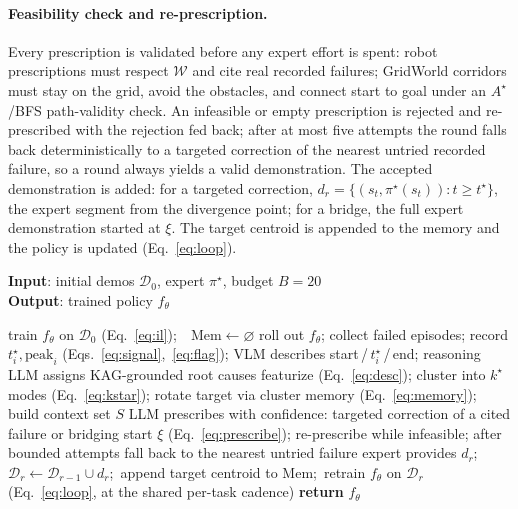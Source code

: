 \documentclass[letterpaper]{article} %
\begin{document}
\paragraph{Feasibility check and re-prescription.}
Every prescription is validated before any expert effort is spent: robot
prescriptions must respect $\mathcal{W}$ and cite real recorded failures;
GridWorld corridors must stay on the grid, avoid the obstacles, and connect
start to goal under an $A^{\!\star}$/BFS path-validity check. An infeasible or empty prescription
is rejected and re-prescribed with the rejection fed back; after at most
five attempts the round falls back deterministically to a targeted
correction of the nearest untried recorded failure, so a round always yields
a valid demonstration. The accepted demonstration is added: for a targeted
correction, $d_r=\{(s_t,\pi^\star(s_t)):t\ge t^\star\}$, the expert segment
from the divergence point; for a bridge, the full expert demonstration
started at $\xi$. The target centroid is appended to the memory and the
policy is updated (Eq.~\ref{eq:loop}).

\begin{algorithm}[tb]
\caption{The DISTIL loop (one demonstration per round).}
\label{alg:distil}
\textbf{Input}: initial demos $\mathcal{D}_0$, expert $\pi^\star$, budget
$B{=}20$\\
\textbf{Output}: trained policy $f_\theta$
\begin{algorithmic}[1]
\STATE train $f_\theta$ on $\mathcal{D}_0$ (Eq.~\ref{eq:il});\ \
$\mathrm{Mem}\leftarrow\varnothing$
  \STATE roll out $f_\theta$; collect failed episodes; record
  $t^\star_i,\mathrm{peak}_i$ (Eqs.~\ref{eq:signal},~\ref{eq:flag}); VLM
  describes start\,/\,$t^\star_i$\,/\,end; reasoning LLM assigns
  KAG-grounded root causes
  \STATE featurize (Eq.~\ref{eq:desc}); cluster into $k^\star$ modes
  (Eq.~\ref{eq:kstar}); rotate target via cluster memory
  (Eq.~\ref{eq:memory}); build context set $S$
  \STATE LLM prescribes with confidence: targeted correction of a cited
  failure or bridging start $\xi$ (Eq.~\ref{eq:prescribe}); re-prescribe
  while infeasible; after bounded attempts fall back to the nearest untried
  failure
  \STATE expert provides $d_r$;\ \
  $\mathcal{D}_r\leftarrow\mathcal{D}_{r-1}\cup d_r$;\ append target centroid
  to $\mathrm{Mem}$;\ retrain $f_\theta$ on $\mathcal{D}_r$
  (Eq.~\ref{eq:loop}, at the shared per-task cadence)
\ENDFOR
\STATE \textbf{return} $f_\theta$
\end{algorithmic}
\end{algorithm}
\end{document}
